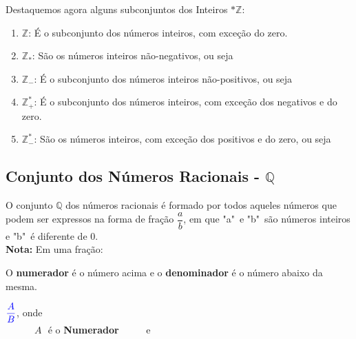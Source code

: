 \begin{multicols*}{2}
		Destaquemos agora alguns subconjuntos dos Inteiros $*\mathbb{Z}$:
		
		\begin{enumerate}
		
		\item $\mathbb{Z}$: É o subconjunto dos números inteiros, com exceção do zero. 
		
		\item $\mathbb{Z}_*$: São os números inteiros não-negativos, ou seja 
		
		\item $\mathbb{Z}_-$: É o subconjunto dos números inteiros não-positivos, ou seja 
		
		\item $\mathbb{Z}^*_+ $: É o subconjunto dos números inteiros, com exceção dos negativos e do zero.
		
		\item $\mathbb{Z}^*_- $: São os números inteiros, com exceção dos positivos e do zero, ou seja 
		
		\end{enumerate}						
		
	\subsection{Conjunto dos Números Racionais - $\mathbb{Q}$}
	
	O conjunto $\mathbb{Q} $ dos números racionais é formado por todos aqueles números que podem ser expressos na forma de fração $\dfrac{a}{b}$, em que "a"\ e "b"\ são números inteiros e "b"\ é diferente de 0.\\
	
	\textbf{\color{blue}Nota:} Em uma fração:
	
	O \textbf{\color{blue} numerador} é o número acima e o \textbf{\color{blue}denominador} é o número abaixo da mesma.
	
	$ \color{blue}\dfrac{A}{B} $, onde\\
	
	$\, \, \, \, \, \, \, \, \, \, \, \, \, \, \, \, \, \,A \, \, $ é o \textbf{\color{blue}Numerador} $\, \, \, \, \, \, \, \, \, \, \, \, \, $ e\\
	

\end{multicols*}
